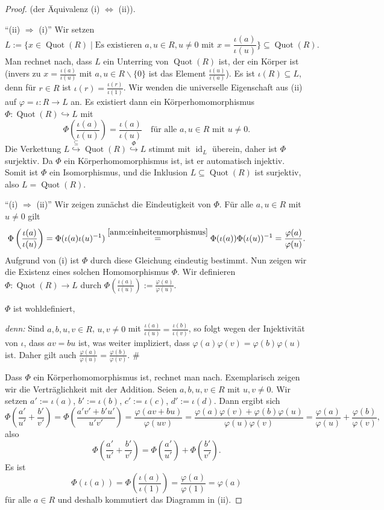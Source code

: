 \documentclass[a4paper, twoside, 11pt, ngerman]{report}
\renewcommand{\setminus}{\smallsetminus}
\DeclareMathOperator{\Quot}{Quot}
\theoremstyle{definistyle}
\theoremstyle{remark}
\newenvironment{denn}%
  {\par\textit{denn:}}%
  {\hfill\#\par}
\begin{document}
\begin{proof}
(der Äquivalenz (i) $\iff$ (ii)).

"`(ii) $\Rightarrow$ (i)"' Wir setzen
\[
L := \{ x \in \Quot(R) \mid \text{Es existieren } a, u \in R, u \neq 0 \text{ mit } x = \frac{\iota(a)}{\iota(u)} \} \subseteq \Quot(R).
\]
Man rechnet nach, dass $L$ ein Unterring von $\Quot(R)$ ist, der ein Körper ist (invers zu $x = \frac{\iota(a)}{\iota(u)}$ mit $a, u \in R\setminus\{0\}$ ist das Element $\frac{\iota(u)}{\iota(a)}$). Es ist $\iota(R) \subseteq L$, denn für $r \in R$ ist $\iota(r) = \frac{\iota(r)}{\iota(1)}$. Wir wenden die universelle Eigenschaft aus (ii) auf $\varphi=\iota\colon R\to L$ an.
Es existiert dann ein Körperhomomorphismus $\Phi \colon \Quot(R) \hookrightarrow L$ mit
\[
\Phi \left( \frac{\iota(a)}{\iota(u)} \right) = \frac{\iota(a)}{\iota(u)} \quad \text{für alle } a, u \in R \text{ mit } u \neq 0.
\]
Die Verkettung $L \overset{\subseteq}{\hookrightarrow} \Quot(R) \overset{\Phi}{\hookrightarrow} L$ stimmt mit $\operatorname{id}_L$ überein, daher ist $\Phi$ surjektiv.
Da $\Phi$ ein Körperhomomorphismus ist, ist er automatisch injektiv. Somit ist $\Phi$ ein Isomorphismus, und die Inklusion $L \subseteq \Quot(R)$ ist surjektiv, also $L = \Quot(R)$.

"`(i) $\Rightarrow$ (ii)"' Wir zeigen zunächst die Eindeutigkeit von $\Phi$.
Für alle $a, u \in R$ mit $u \neq 0$ gilt
\[
\Phi \left( \frac{\iota(a)}{\iota(u)} \right) = \Phi (\iota(a)\iota(u)^{-1}) \overset{\ref{anm:einheitenmorphismus}}{=} \Phi(\iota(a)) \Phi(\iota(u))^{-1} = \frac{\varphi(a)}{\varphi(u)}.
\]
Aufgrund von (i) ist $\Phi$ durch diese Gleichung eindeutig bestimmt.
Nun zeigen wir die Existenz eines solchen Homomorphismus $\Phi$. 
Wir definieren $\Phi \colon \Quot(R) \to L$ durch $\Phi\left(\frac{\iota(a)}{\iota(u)}\right) := \frac{\varphi(a)}{\varphi(u)}$.

$\Phi$ ist wohldefiniert,
\begin{denn}
Sind $a, b, u, v \in R$, $u, v \neq 0$ mit $\frac{\iota(a)}{\iota(u)} = \frac{\iota(b)}{\iota(v)}$, so folgt wegen der Injektivität von $\iota$, dass $a v = b u$ ist, was weiter impliziert, dass $\varphi(a) \varphi(v) = \varphi(b) \varphi(u)$ ist. Daher gilt auch $\frac{\varphi(a)}{\varphi(u)} = \frac{\varphi(b)}{\varphi(v)}$.
\end{denn}

Dass $\Phi$ ein Körperhomomorphismus ist, rechnet man nach. Exemplarisch zeigen wir die Verträglichkeit mit der Addition. Seien $a, b, u, v \in R$ mit $u, v \neq 0$. Wir setzen
$a':=\iota(a)$, $b':=\iota(b)$, $c':=\iota(c)$, $d':=\iota(d)$. Dann ergibt sich
\[
\Phi \left( \frac{a'}{u'} + \frac{b'}{v'} \right) = \Phi \left( \frac{a' v' + b' u'}{u' v'} \right) = \frac{\varphi(a v + b u)}{\varphi(u v)} = \frac{\varphi(a) \varphi(v) + \varphi(b) \varphi(u)}{\varphi(u) \varphi(v)} = \frac{\varphi(a)}{\varphi(u)} + \frac{\varphi(b)}{\varphi(v)},
\]
also
\[
\Phi \left( \frac{a'}{u'}  + \frac{b'}{v'} \right)=
\Phi \left( \frac{a'}{u'} \right) + \Phi \left( \frac{b'}{v'} \right).
\]
Es ist
\[
\Phi(\iota(a))=\Phi\left(\frac{\iota(a)}{\iota(1)}\right)=\frac{\varphi(a)}{\varphi(1)}=\varphi(a)
\]
für alle $a\in R$ und deshalb kommutiert das Diagramm in (ii).
\end{proof}
\end{document}
